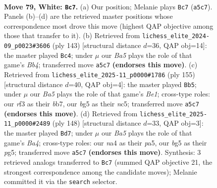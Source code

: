 \documentclass[11pt]{article}
\begin{document}
\clearpage

\begin{figure}[p]\centering
\begin{subfigure}{0.46\textwidth}\centering
\resizebox{\linewidth}{!}{%
\newchessgame
\chessboard[
  setfen={8/8/3p1k1p/B3p1b1/n1K1P2p/5r2/7R/8 w - - 0 79},
  showmover=false,
  pgfstyle=straightmove, color=movearrow, markmove={a5-c7}
]}
\caption{}
\end{subfigure}\hfill
\begin{subfigure}{0.46\textwidth}\centering
\resizebox{\linewidth}{!}{%
\newchessgame
\chessboard[
  setfen={8/6pk/5p2/1b6/5BP1/3rPPK1/8/4R3 b - - 31 72},
  showmover=false,
  pgfstyle=straightmove, color=movearrow, markmove={b5-c4}
]}
\caption{}
\end{subfigure}
\\[4pt]
\begin{subfigure}{0.46\textwidth}\centering
\resizebox{\linewidth}{!}{%
\newchessgame
\chessboard[
  setfen={4b3/rB6/8/2N1k3/1P3p1p/5P1P/6P1/6K1 b - - 3 78},
  showmover=false,
  pgfstyle=straightmove, color=movearrow, markmove={e8-b5}
]}
\caption{}
\end{subfigure}\hfill
\begin{subfigure}{0.46\textwidth}\centering
\resizebox{\linewidth}{!}{%
\newchessgame
\chessboard[
  setfen={8/7p/1b6/p3p1p1/B1Kp1k2/7P/8/8 w - - 4 75},
  showmover=false,
  pgfstyle=straightmove, color=movearrow, markmove={a4-d7}
]}
\caption{}
\end{subfigure}
\caption{\textbf{Move 79, White: \texttt{Bc7}.} (a) Our position; Melanie plays \texttt{Bc7} (\texttt{a5c7}). Panels (b)--(d) are the retrieved master positions whose correspondence most drove this move (highest QAP objective among those that transfer to it). (b) Retrieved from \texttt{lichess\_elite\_2024-09\_p0023\#3606} (ply 143) [structural distance $d$=36, QAP obj=14]: the master played \texttt{Bc4}; under $\mu$ our \emph{Ba5} plays the role of that game's \emph{Bb4}; transferred move \texttt{a5c7} \textbf{(endorses this move)}. (c) Retrieved from \texttt{lichess\_elite\_2025-11\_p0000\#1786} (ply 155) [structural distance $d$=40, QAP obj=4]: the master played \texttt{Bb5}; under $\mu$ our \emph{Ba5} plays the role of that game's \emph{Be1}; cross-type roles: our \emph{r}f3 as their \emph{b}b7, our \emph{b}g5 as their \emph{n}c5; transferred move \texttt{a5c7} \textbf{(endorses this move)}. (d) Retrieved from \texttt{lichess\_elite\_2025-11\_p0000\#2489} (ply 148) [structural distance $d$=33, QAP obj=3]: the master played \texttt{Bd7}; under $\mu$ our \emph{Ba5} plays the role of that game's \emph{Ba4}; cross-type roles: our \emph{n}a4 as their \emph{p}a5, our \emph{b}g5 as their \emph{p}g5; transferred move \texttt{a5c7} \textbf{(endorses this move)}. Synthesis: 3 retrieved analogs transferred to \texttt{Bc7} (summed QAP objective 21, the strongest correspondence among the candidate moves); Melanie committed it via the \texttt{search} selector.}
\label{fig:thought-m156}
\end{figure}
\end{document}
